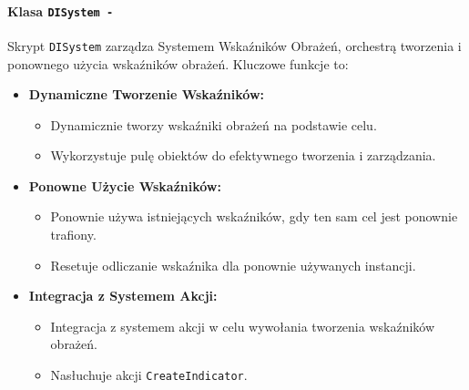 \paragraph{Klasa \texttt{DISystem -}}
Skrypt \texttt{DISystem} zarządza Systemem Wskaźników Obrażeń, orchestrą tworzenia i ponownego użycia wskaźników obrażeń. Kluczowe funkcje to:
\begin{itemize}
\item \textbf{Dynamiczne Tworzenie Wskaźników:}
\begin{itemize}
\item Dynamicznie tworzy wskaźniki obrażeń na podstawie celu.
\item Wykorzystuje pulę obiektów do efektywnego tworzenia i zarządzania.
\end{itemize}
\item \textbf{Ponowne Użycie Wskaźników:}
\begin{itemize}
\item Ponownie używa istniejących wskaźników, gdy ten sam cel jest ponownie trafiony.
\item Resetuje odliczanie wskaźnika dla ponownie używanych instancji.
\end{itemize}
\item \textbf{Integracja z Systemem Akcji:}
\begin{itemize}
\item Integracja z systemem akcji w celu wywołania tworzenia wskaźników obrażeń.
\item Nasłuchuje akcji \texttt{CreateIndicator}.
\end{itemize}
\end{itemize}


